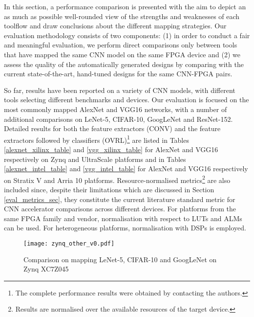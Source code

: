 \documentclass[format=acmsmall, review=false, screen=true]{acmart}
\begin{document}
In this section, a performance comparison is presented with the aim to depict an as much as possible well-rounded view of the strengths and weaknesses of each toolflow and draw conclusions about the different mapping strategies. Our evaluation methodology consists of two components: (1) in order to conduct a fair and meaningful evaluation, we perform direct comparisons only between tools that have mapped the same CNN model on the same FPGA device and (2) we assess the quality of the automatically generated designs by comparing with the current state-of-the-art, hand-tuned designs for the same CNN-FPGA pairs.

So far, results have been reported on a variety of CNN models, with different tools selecting different benchmarks and devices. Our evaluation is focused on the most commonly mapped AlexNet and VGG16 networks, {\color{black}with a number of additional comparisons on LeNet-5, CIFAR-10, GoogLeNet and ResNet-152.} Detailed results for both the feature extractors (CONV) and the feature extractors followed by classifiers (OVRL)\footnote{The complete performance results were obtained by contacting the authors.} are listed in Tables \ref{alexnet_xilinx_table} and \ref{vgg_xilinx_table} for AlexNet and VGG16 respectively on Zynq and UltraScale platforms and in Tables \ref{alexnet_intel_table} and \ref{vgg_intel_table} for AlexNet and VGG16 respectively on Stratix V and Arria 10 platforms. Resource-normalised metrics\footnote{Results are normalised over the available resources of the target device.} are also included since, despite their limitations which are discussed in Section \ref{eval_metrics_sec}, they constitute the current literature standard metric for CNN accelerator comparisons across different devices. For platforms from the same FPGA family and vendor, normalisation with respect to LUTs and ALMs can be used. For heterogeneous platforms, normalisation with DSPs is employed.


\begin{figure*}[t]
    \centering
    \texttt{[image: zynq\_other\_v0.pdf]}
    \vspace{-0.3cm}
    \caption{Comparison on mapping LeNet-5, CIFAR-10 and GoogLeNet on Zynq XC7Z045}
    \label{fig:zynq_others}
    \vspace{-0.5cm}
\end{figure*}
\end{document}
